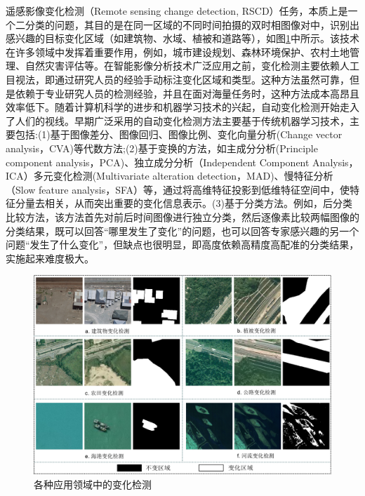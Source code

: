 \documentclass[lang=chs, degree=master, blindreview=false, adobe=false]{yanputhesis}
\begin{document}
遥感影像变化检测（Remote sensing change detection, RSCD）任务，本质上是一个二分类的问题，其目的是在同一区域的不同时间拍摄的双时相图像对中，识别出感兴趣的目标变化区域（如建筑物、水域、植被和道路等），如图\ref{fig:background}中所示。该技术在许多领域中发挥着重要作用，例如，城市建设规划\cite{urban2010ISPRS}\cite{Zhang24urban}\cite{urban2024}、森林环境保护\cite{hao2016forestCD}、农村土地管理\cite{xing2023Progressive}\cite{xing2024Improving}\cite{ruralLand}、自然灾害评估\cite{disaster2018landslide}\cite{disaster2018earthquake}等。在智能影像分析技术广泛应用之前，变化检测主要依赖人工目视法，即通过研究人员的经验手动标注变化区域和类型。这种方法虽然可靠，但是依赖于专业研究人员的检测经验，并且在面对海量任务时，这种方法成本高昂且效率低下。随着计算机科学的进步和机器学习技术的兴起，自动变化检测开始走入了人们的视线。早期广泛采用的自动变化检测方法主要基于传统机器学习技术，主要包括:(1)基于图像差分\cite{mondini2011semi}、图像回归\cite{ludeke1990logistic_regression}、图像比例\cite{mondini2011semi}、变化向量分析\cite{du2020CVA}(Change vector analysis，CVA)等代数方法;(2)基于变换的方法，如主成分分析\cite{celik2009pca}(Principle component analysis，PCA)、独立成分分析\cite{marchesi2009ica}（Independent Component Analysis，ICA）多元变化检测\cite{nielsen1998mad}(Multivariate alteration detection，MAD)、慢特征分析\cite{wu2013slow}（Slow feature analysis，SFA）等，通过将高维特征投影到低维特征空间中，使特征分量去相关，从而突出重要的变化信息表示。(3)基于分类方法。例如，后分类比较方法，该方法首先对前后时间图像进行独立分类，然后逐像素比较两幅图像的分类结果，既可以回答“哪里发生了变化”的问题，也可以回答专家感兴趣的另一个问题“发生了什么变化”，但缺点也很明显，即高度依赖高精度高配准的分类结果，实施起来难度极大。
\begin{figure}[htb]
	\centering
	\includegraphics[scale=0.55]{images/fig1.png}
	\caption{
		各种应用领域中的变化检测
	}
	\label{fig:background}
\end{figure}
\end{document}
